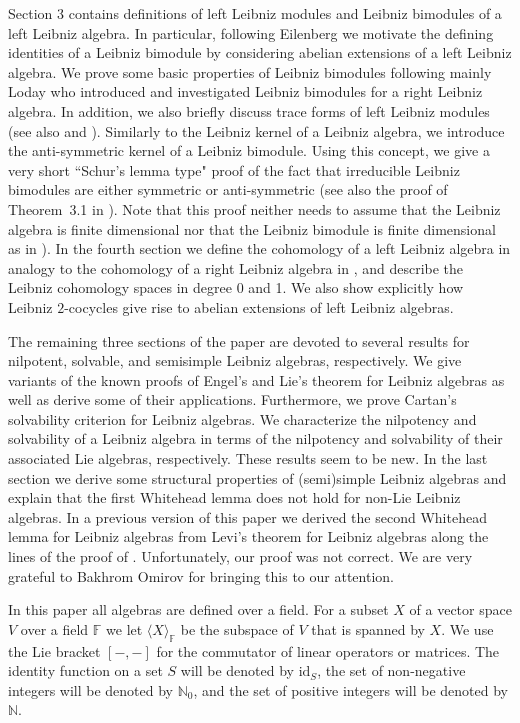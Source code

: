 \documentclass{amsart}
\numberwithin{equation}{section}
\newcommand{\id}{\mathrm{id}}
\newcommand{\N}{\mathbb{N}}
\newcommand{\F}{\mathbb{F}}
\begin{document}
Section 3 contains definitions of left Leibniz modules and Leibniz bimodules of a left Leibniz
algebra. In particular, following Eilenberg \cite{E} we motivate the defining identities of a
Leibniz bimodule by considering abelian extensions of a left Leibniz algebra. We prove
some basic properties of Leibniz bimodules following mainly Loday \cite{L,LP1} who
introduced and investigated Leibniz bimodules for a right Leibniz algebra. In addition,
we also briefly discuss trace forms of left Leibniz modules (see also \cite{AAO2} and
\cite{DMS1}). Similarly to the Leibniz kernel of a Leibniz algebra, we introduce the
anti-symmetric kernel of a Leibniz bimodule. Using this concept, we give a very short
``Schur's lemma type" proof of the fact that irreducible Leibniz bimodules are either
symmetric or anti-symmetric (see also the proof of Theorem~3.1 in \cite{FM}). Note
that this proof neither needs to assume that the Leibniz algebra is finite dimensional
nor that the Leibniz bimodule is finite dimensional as in \cite[Theorem 1.4]{B2}). In
the fourth section we define the cohomology of a left Leibniz algebra in analogy to
the cohomology of a right Leibniz algebra in \cite{L,LP1}, and describe the Leibniz
cohomology spaces in degree 0 and 1. We also show explicitly how Leibniz $2$-cocycles
give rise to abelian extensions of left Leibniz algebras.

The remaining three sections of the paper are devoted to several results for nilpotent,
solvable, and semisimple Leibniz algebras, respectively. We give variants of the known
proofs of Engel's and Lie's theorem for Leibniz algebras as well as derive some of their
applications. Furthermore, we prove Cartan's solvability criterion for Leibniz algebras.
We characterize the nilpotency and solvability of a Leibniz algebra in terms of the nilpotency
and solvability of their associated Lie algebras, respectively. These results seem to be
new. In the last section we derive some structural properties of (semi)simple Leibniz
algebras and explain that the first Whitehead lemma does not hold for non-Lie Leibniz
algebras. In a previous version of this paper we derived the second Whitehead lemma
for Leibniz algebras from Levi's theorem for Leibniz algebras along the lines of the proof
of \cite[Proposition 3.22]{S}. Unfortunately, our proof was not correct. We are very
grateful to Bakhrom Omirov for bringing this to our attention.

In this paper all algebras are defined over a field. For a subset $X$ of a vector space $V$
over a field $\F$ we let $\langle X\rangle_\F$ be the subspace of $V$ that is spanned by
$X$. We use the Lie bracket $[-,-]$ for the commutator of linear operators or matrices.
The identity function on a set $S$ will be denoted by $\id_S$, the set of non-negative
integers will be denoted by $\N_0$, and the set of positive integers will be denoted by
$\N$.
\end{document}
